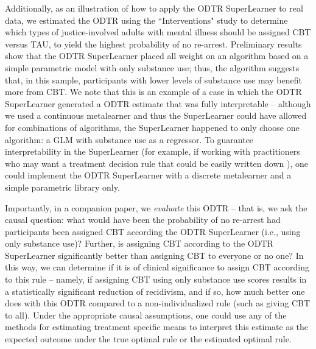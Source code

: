 \documentclass[a4paper,12pt]{article}
\begin{document}

Additionally, as an illustration of how to apply the ODTR SuperLearner to real data, we estimated the ODTR using the ``Interventions" study to determine which types of justice-involved adults with mental illness should be assigned CBT versus TAU, to yield the highest probability of no re-arrest. Preliminary results show that the ODTR SuperLearner placed all weight on an algorithm based on a simple parametric model with only substance use; thus, the algorithm suggests that, in this sample, participants with lower levels of substance use may benefit more from CBT. We note that this is an example of a case in which the ODTR SuperLearner generated a ODTR estimate that was fully interpretable -- although we used a continuous metalearner and thus the SuperLearner could have allowed for combinations of algorithms, the SuperLearner happened to only choose one algorithm: a GLM with substance use as a regressor. To guarantee interpretability in the SuperLearner (for example, if working with practitioners who may want a treatment decision rule that could be easily written down \citep{kosorok2019precision, cohen2018treatment}), one could implement the ODTR SuperLearner with a discrete metalearner and a simple parametric library only. 


Importantly, in a companion paper, we \emph{evaluate} this ODTR -- that is, we ask the causal question: what would have been the probability of no re-arrest had participants been assigned CBT according the ODTR SuperLearner (i.e., using only substance use)? Further, is assigning CBT according to the ODTR SuperLearner significantly better than assigning CBT to everyone or no one? In this way, we can determine if it is of clinical significance to assign CBT according to this rule -- namely, if assigning CBT using only substance use scores results in a statistically significant reduction of recidivism, and if so, how much better one does with this ODTR compared to a non-individualized rule (such as giving CBT to all). Under the appropriate causal assumptions, one could use any of the methods for estimating treatment specific means to interpret this estimate as the expected outcome under the true optimal rule or the estimated optimal rule. 
\end{document}
